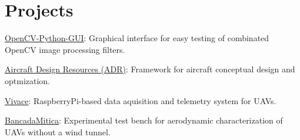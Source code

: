 \documentclass[A4]{deedy-resume} %
\begin{document}
\begin{minipage}[t]{0.67\textwidth}

\section{Projects}

\vspace{\topsep}
\begin{tightitemize}
\item \href{https://github.com/rafaellehmkuhl/OpenCV-Python-GUI}{OpenCV-Python-GUI}: Graphical interface for easy testing of combinated OpenCV image processing filters.
\item \href{https://github.com/CeuAzul/ADR}{Aircraft Design Resources (ADR)}: Framework for aircraft conceptual design and optmization.
\item \href{https://github.com/CeuAzul/Vivace}{Vivace}: RaspberryPi-based data aquisition and telemetry system for UAVs.
\item \href{https://github.com/rafaellehmkuhl/Bancada-Mitica-Parts-Models}{BancadaMitica}: Experimental test bench for aerodynamic characterization of UAVs without a wind tunnel.
\end{tightitemize}
 
\sectionspace %

\end{minipage} %

\end{document}
